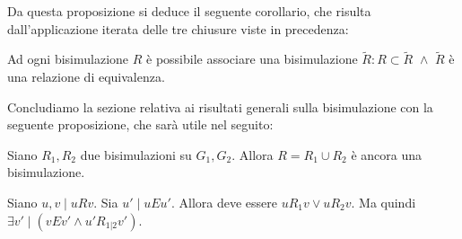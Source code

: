 Da questa proposizione si deduce il seguente corollario, che risulta dall'applicazione iterata delle tre chiusure viste in precedenza:
\begin{corollary}
    Ad ogni bisimulazione $R$ è possibile associare una bisimulazione $\widetilde{R} : R \subset \widetilde{R} \,\,\land\,\, \widetilde{R}$ è una relazione di equivalenza.
    \label{cor:bisimulation_eqrel}
\end{corollary}
Concludiamo la sezione relativa ai risultati generali sulla bisimulazione con la seguente proposizione, che sarà utile nel seguito:
\begin{proposition}
    Siano $R_1, R_2$ due bisimulazioni su $G_1, G_2$. Allora $R = R_1 \cup R_2$ è ancora una bisimulazione.
    \label{obs:bisimulation_union}
\end{proposition}
\begin{proof2}
    Siano $u,v \mid u R v$. Sia $u' \mid u E u'$. Allora deve essere $u R_1 v \lor u R_2 v$. Ma quindi $\exists v' \mid (v E v' \land u' R_{1|2} v')$.
\end{proof2}

